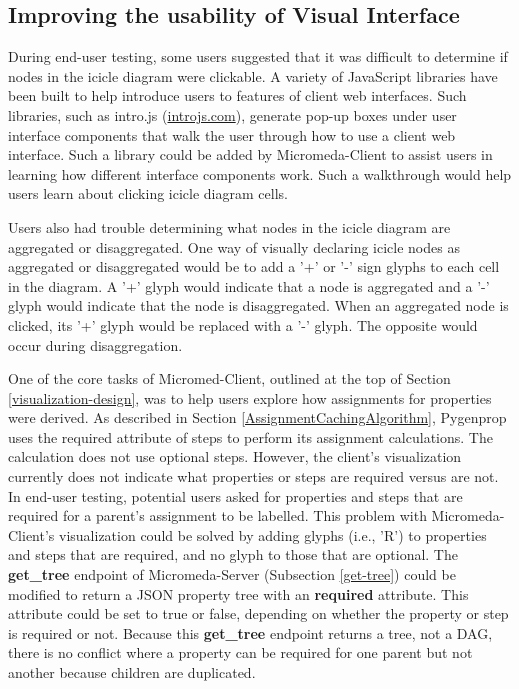 \subsection{Improving the usability of Visual Interface}

During end-user testing, some users suggested that it was difficult to determine if nodes in the icicle diagram were clickable. A variety of JavaScript libraries have been built to help introduce users to features of client web interfaces. Such libraries, such as intro.js \cite{mehrabani} (\href{introjs.com}{introjs.com}), generate pop-up boxes under user interface components that walk the user through how to use a client web interface. Such a library could be added by Micromeda-Client to assist users in learning how different interface components work. Such a walkthrough would help users learn about clicking icicle diagram cells.

Users also had trouble determining what nodes in the icicle diagram are aggregated or disaggregated. One way of visually declaring icicle nodes as aggregated or disaggregated would be to add a '+' or '-' sign glyphs to each cell in the diagram. A '+' glyph would indicate that a node is aggregated and a '-' glyph would indicate that the node is disaggregated. When an aggregated node is clicked, its '+' glyph would be replaced with a '-' glyph. The opposite would occur during disaggregation.

One of the core tasks of Micromed-Client, outlined at the top of Section \ref{visualization-design}, was to help users explore how assignments for properties were derived. As described in Section \ref{AssignmentCachingAlgorithm}, Pygenprop uses the required attribute of steps to perform its assignment calculations. The calculation does not use optional steps. However, the client's visualization currently does not indicate what properties or steps are required versus are not. In end-user testing, potential users asked for properties and steps that are required for a parent's assignment to be labelled. This problem with Micromeda-Client's visualization could be solved by adding glyphs (i.e., 'R') to properties and steps that are required, and no glyph to those that are optional. The \textbf{get\_tree} endpoint of Micromeda-Server (Subsection \ref{get-tree}) could be modified to return a JSON property tree with an \textbf{required} attribute. This attribute could be set to true or false, depending on whether the property or step is required or not. Because this \textbf{get\_tree} endpoint returns a tree, not a DAG, there is no conflict where a property can be required for one parent but not another because children are duplicated.


